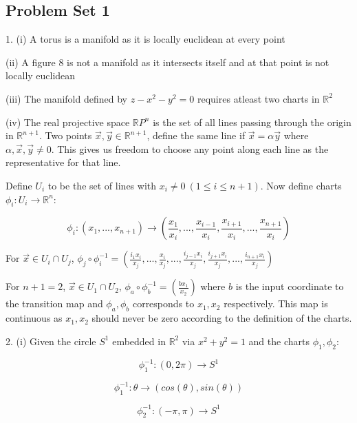 \documentclass{article}\usepackage[]{graphicx}\usepackage[]{color}
\begin{document}
\subsection{Problem Set 1}


1. (i) A torus is a manifold as it is locally euclidean at every point

(ii) A figure 8 is not a manifold as it intersects itself and at that point is not locally euclidean 

(iii) The manifold defined by $z-x^2-y^2=0$ requires atleast two charts in $\mathbb{R}^2$

(iv) The real projective space $\mathbb{R}P^n$ is the set of all lines passing through the origin in $\mathbb{R}^{n+1}$. Two points $\vec{x},\vec{y}\in\mathbb{R}^{n+1}$, define the same line if $\vec{x}=\alpha\vec{y}$ where $\alpha,\vec{x},\vec{y}\neq 0$. This gives us freedom to choose any point along each line as the representative for that line. 

Define $U_i$ to be the set of lines with $x_i\neq 0 \ (1\leq i\leq n+1)$. Now define charts $\phi_i:U_i\rightarrow \mathbb{R}^n$:

$$
\phi_i: (x_1,...,x_{n+1})\rightarrow \left(\frac{x_1}{x_i},...,\frac{x_{i-1}}{x_i},\frac{x_{i+1}}{x_i},...,\frac{x_{n+1}}{x_i}\right)
$$ 

For $\vec{x}\in U_i\cap U_j$, $\phi_j\circ\phi_i^{-1}=
\left(\frac{i_1 x_i}{x_j},...,\frac{x_i}{x_j} ,...,\frac{i_{j-1}x_i}{x_j},\frac{i_{j+1}x_i}{x_j},...,\frac{i_{n+1}x_i}{x_j}\right)
$

For $n+1=2$, $\vec{x}\in U_1\cap U_2$, $\phi_a\circ\phi_b^{-1}=
\left(\frac{bx_1}{x_2}\right) 
$ where $b$ is the input coordinate to the transition map and $\phi_a,\phi_b$ corresponds to $x_1,x_2$ respectively. This map is continuous as $x_1,x_2$ should never be zero according to the definition of the charts.

2. (i) Given the circle $S^1$ embedded in $\mathbb{R}^2$ via $x^2+y^2=1$ and the charts $\phi_1 ,\phi_2$:

$$
\phi_1^{-1}: (0,2\pi )\rightarrow S^1
$$

\vspace{-.3cm}

$$
\phi_1^{-1}: \theta \rightarrow (cos(\theta ),sin(\theta ))
$$

\medskip

$$
\phi_2^{-1}: (-\pi ,\pi )\rightarrow S^1
$$

\vspace{-.3cm}
\end{document}
